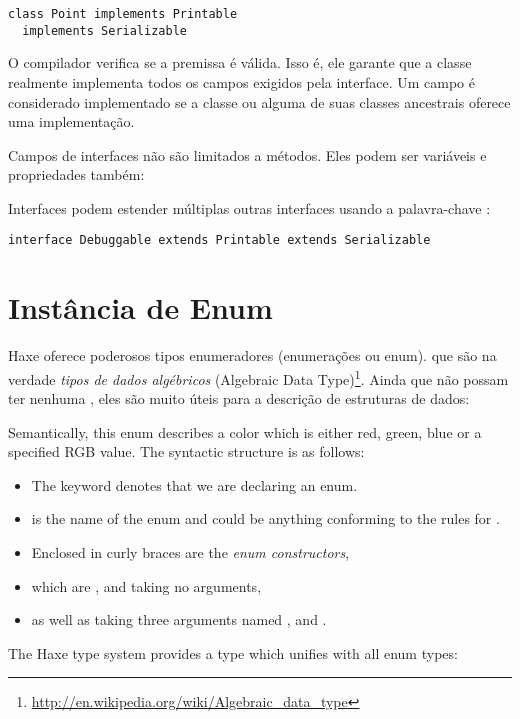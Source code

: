 \begin{lstlisting}
class Point implements Printable
  implements Serializable
\end{lstlisting}

O compilador verifica se a premissa  é válida. Isso é, ele garante que a classe  realmente implementa todos os campos exigidos pela interface. Um campo é considerado implementado se a classe ou alguma de suas classes ancestrais oferece uma implementação.

Campos de interfaces não são limitados a métodos. Eles podem ser variáveis e propriedades também:


Interfaces podem estender múltiplas outras interfaces usando a palavra-chave :
\begin{lstlisting}
interface Debuggable extends Printable extends Serializable
\end{lstlisting}




\section{Instância de Enum}
\label{types-enum-instance}

Haxe oferece poderosos tipos enumeradores (enumerações ou enum). que são na verdade \emph{tipos de dados algébricos} (Algebraic Data Type)\footnote{\url{http://en.wikipedia.org/wiki/Algebraic_data_type}}. Ainda que não possam ter nenhuma  , eles são muito úteis para a descrição de estruturas de dados:

Semantically, this enum describes a color which is either red, green, blue or a specified RGB value. The syntactic structure is as follows:
\begin{itemize}
	\item The keyword  denotes that we are declaring an enum.
	\item {} is the name of the enum and could be anything conforming to the rules for .
	\item Enclosed in curly braces \expr{$\left\{\right\}$} are the \emph{enum constructors},
	\item which are ,  and  taking no arguments,
	\item as well as  taking three  arguments named ,  and .
\end{itemize}
The Haxe type system provides a type which unifies with all enum types:

